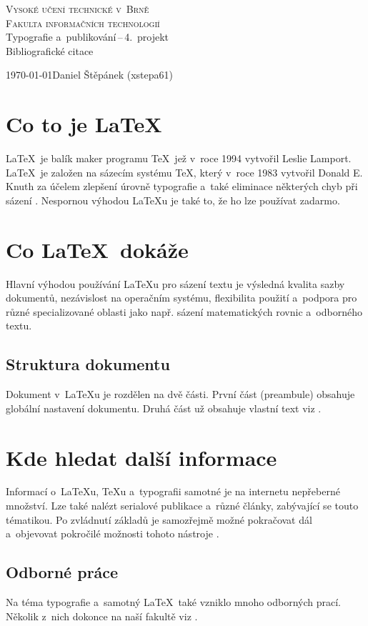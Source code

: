 \documentclass[a4paper, 11pt]{article}
\begin{document}
	\begin{titlepage}
		\begin{center}
			\Huge
			\textsc{Vysoké učení technické v~Brně} \\
			\huge
			\textsc{Fakulta informačních technologií} \\
			\LARGE
			Typografie a~publikování\,--\,4.~projekt \\
			\Huge
			Bibliografické citace
		\end{center}

{\LARGE \today \hfill Daniel Štěpánek (xstepa61)}
	\end{titlepage}

\section{Co to je \LaTeX}
\LaTeX \ je balík maker programu \TeX \ jež v~roce 1994 vytvořil Leslie Lamport. \LaTeX \ je založen na sázecím systému \TeX, který v~roce 1983 vytvořil Donald E. Knuth za účelem zlepšení úrovně typografie a~také eliminace některých chyb při sázení \cite{Kopkac2004}\cite{Simecek2013}. Nespornou výhodou \LaTeX u je také to, že ho lze používat zadarmo.

\section{Co \LaTeX \ dokáže}
Hlavní výhodou používání \LaTeX u pro sázení textu je výsledná kvalita sazby dokumentů, nezávislost na operačním systému, flexibilita použití a~podpora pro různé specializované oblasti jako např. sázení matematických rovnic a~odborného textu.


\subsection{Struktura dokumentu}
Dokument v~{\LaTeX}u je rozdělen na dvě části. První část (preambule) obsahuje globální nastavení dokumentu.
Druhá část už obsahuje vlastní text viz \cite{Rybicka2003}.


\section{Kde hledat další informace}
Informací o~\LaTeX u, \TeX u a~typografii samotné je na internetu nepřeberné množství. Lze také nalézt serialové publikace\cite{MackiewiczJ2003Wtws} a~různé články\cite{DemaineErikD.2015FwfA}\cite{BangWong2011PovT}, zabývající se touto tématikou. Po zvládnutí základů je samozřejmě možné pokračovat dál a~objevovat pokročilé možnosti tohoto nástroje \cite{Svamberg2001}\cite{Martinek2010}.

\subsection{Odborné práce}
Na téma typografie a~samotný \LaTeX \ také vzniklo mnoho odborných prací. Několik z~nich dokonce na naší fakultě viz \cite{Sokol2012} \cite{Simek2009}. \cite{test}

\newpage

\renewcommand{\refname}{Literatura}

\end{document}
